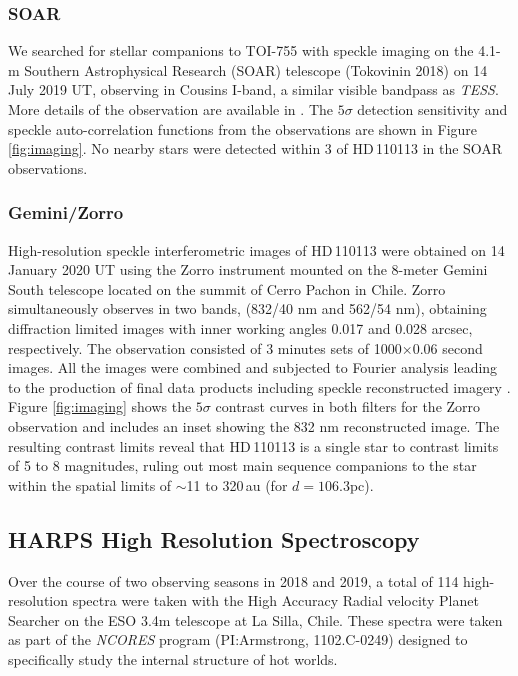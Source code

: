 \documentclass[fleqn,usenatbib]{mnras}
\newcommand{\tess}{{\it TESS}}
\newcommand{\Tstar}{HD\,110113}
\begin{document}
\subsubsection{SOAR}
We searched for stellar companions to TOI-755 with speckle imaging on the 4.1-m Southern Astrophysical Research (SOAR) telescope (Tokovinin 2018) on 14 July 2019 UT, observing in Cousins I-band, a similar visible bandpass as \tess{}. More details of the observation are available in \citet{ziegler2020vizier}. The $5\sigma$ detection sensitivity and speckle auto-correlation functions from the observations are shown in Figure \ref{fig:imaging}. No nearby stars were detected within 3\arcsec{} of \Tstar{} in the SOAR observations.

\subsubsection{Gemini/Zorro}
High-resolution speckle interferometric images of \Tstar{} were obtained on 14 January 2020 UT using the Zorro instrument mounted on the 8-meter Gemini South telescope located on the summit of Cerro Pachon in Chile. 
Zorro simultaneously observes in two bands, (832/40 nm and 562/54 nm), obtaining diffraction limited images with inner working angles 0.017 and 0.028 arcsec, respectively.
The observation consisted of 3 minutes sets of 1000×0.06 second images. All the images were combined and subjected to Fourier analysis leading to the production of final data products including speckle reconstructed imagery \citep[see][]{2011AJ....142...19H}.
Figure \ref{fig:imaging} shows the $5\sigma$ contrast curves in both filters for the Zorro observation and includes an inset showing the 832 nm reconstructed image.
The resulting contrast limits reveal that \Tstar{} is a single star to contrast limits of 5 to 8 magnitudes, ruling out most main sequence companions to the star within the spatial limits of $\sim$11 to 320\,au (for $d=106.3$pc).

\subsection{HARPS High Resolution Spectroscopy}
Over the course of two observing seasons in 2018 and 2019, a total of 114 high-resolution spectra were taken with the High Accuracy Radial velocity Planet Searcher \citep[HARPS,][]{Pepe:2002,2003Msngr.114...20M} on the ESO 3.4m telescope at La Silla, Chile.
These spectra were taken as part of the \textit{NCORES} program (PI:Armstrong, 1102.C-0249) designed to specifically study the internal structure of hot worlds.
\end{document}
